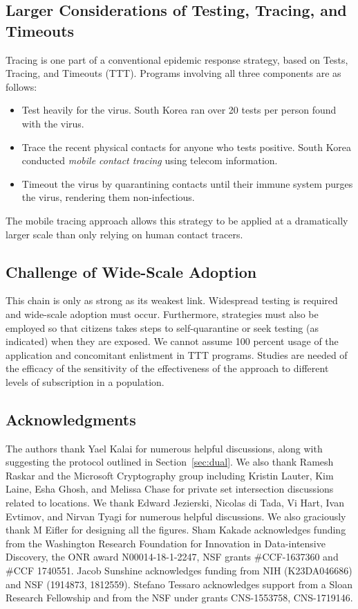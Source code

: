 \documentclass{article}
\begin{document}
\subsection{Larger Considerations of Testing, Tracing, and Timeouts}
Tracing is one part of a conventional epidemic response strategy, based on Tests, Tracing, and Timeouts (TTT). Programs involving all three components are as follows:
\begin{itemize}
\item Test heavily for the virus.  South Korea ran over 20 tests per person found with the virus. 
\item Trace the recent physical contacts for anyone who tests positive.  South Korea conducted \emph{mobile contact tracing} using telecom information.
\item Timeout the virus by quarantining contacts until their immune system purges the virus, rendering them non-infectious.
\end{itemize}
The mobile tracing approach allows this strategy to be applied at a dramatically larger scale than only relying on human contact tracers.  

\subsection{Challenge of Wide-Scale Adoption}
This chain is only as strong as its weakest link.  Widespread testing is required and wide-scale adoption must occur. Furthermore, strategies must also be employed so that citizens takes steps to self-quarantine or seek testing (as indicated) when they are exposed. We cannot assume 100 percent usage of the application and concomitant enlistment in TTT programs.  Studies are needed of the efficacy of the sensitivity of the effectiveness of the approach to different levels of subscription in a population.

\subsection*{Acknowledgments}
The authors thank Yael Kalai for numerous helpful discussions, along with suggesting the protocol outlined in Section~\ref{sec:dual}. We also thank Ramesh Raskar and the Microsoft Cryptography group including Kristin Lauter, Kim Laine, Esha Ghosh, and Melissa Chase for private set intersection discussions related to locations.
We thank Edward Jezierski, Nicolas di Tada, Vi Hart, Ivan Evtimov, and Nirvan Tyagi for numerous helpful discussions. We also graciously thank M Eifler for designing all the figures.
Sham Kakade acknowledges funding from the Washington Research
Foundation for Innovation in Data-intensive Discovery, the ONR award
N00014-18-1-2247, NSF grants \#CCF-1637360 and \#CCF 1740551. Jacob Sunshine acknowledges
funding from NIH (K23DA046686) and NSF (1914873, 1812559). Stefano Tessaro acknowledges support from a Sloan Research Fellowship and from the NSF under grants CNS-1553758, CNS-1719146.
\end{document}
